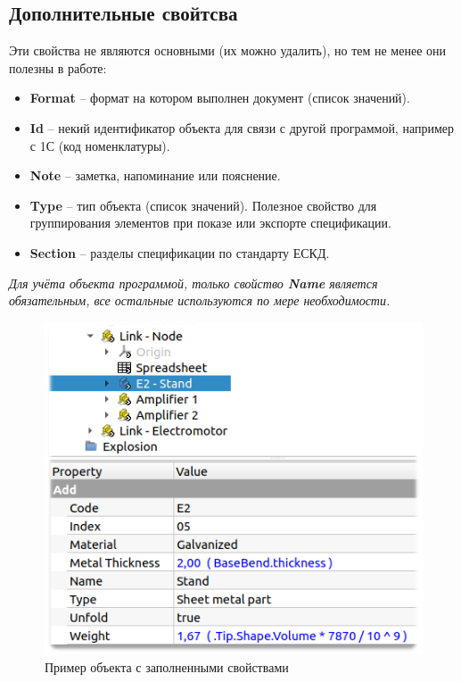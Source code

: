 \documentclass[a4paper,12pt]{article}
\begin{document}
\subsection{Дополнительные свойтсва}

Эти свойства не являются основными (их можно удалить), но тем не менее они полезны в работе:
\begin{itemize}
	\item \textbf{Format} -- формат на котором выполнен документ (список значений).
	\item \textbf{Id} -- некий идентификатор объекта для связи с другой программой, например с 1С (код номенклатуры).
	\item \textbf{Note} -- заметка, напоминание или пояснение.
	\item \textbf{Type} -- тип объекта (список значений). Полезное свойство для группирования элементов при показе или экспорте спецификации.
	\item \textbf{Section} -- разделы спецификации по стандарту ЕСКД.
\end{itemize}

\begin{center}\emph{Для учёта объекта программой, только свойство \textbf{Name} является обязательным, все остальные используются по мере необходимости.}\end{center}

\begin{figure}[htp]
	\centering
	\includegraphics[scale=0.8]{img/properties.png}
	\caption{Пример объекта с заполненными свойствами}
	\label{sec:properties}
\end{figure}
\end{document}
